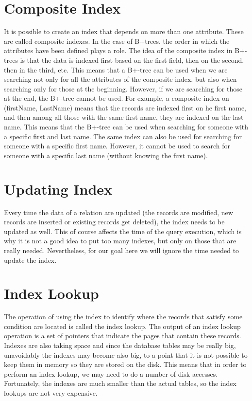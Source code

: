 \documentclass[12pt]{article}
\begin{document}
\section{Composite Index}

It is possible to create an index that depends on more than one attribute. These are called composite indexes. In the case of B+trees, the order in which the attributes have been defined plays a role. The idea of the composite index in B+-trees is that the data is indexed first based on the first field, then on the second, then in the third, etc. This means that a B+-tree can be used when we are searching not only for all the attributes of the composite index, but also when searching only for those at the beginning. However, if we are searching for those at the end, the B+-tree cannot be used. For example, a composite index on (firstName, LastName) means that the records are indexed first on he first name, and then among all those with the same first name, they are indexed on the last name. This means that the B+-tree can be used when searching for someone with a specific first and last name. The same index can also be used for searching for someone with a specific first name. However, it cannot be used to search for someone with a specific last name (without knowing the first name).

\section{Updating Index}

Every time the data of a relation are updated (the records are modified, new records are inserted or existing records get deleted), the index needs to be updated as well. This of course affects the time of the query execution, which is why it is not a good idea to put too many indexes, but only on those that are really needed. Nevertheless, for our goal here we will ignore the time needed to update the index.

\section{Index Lookup}

The operation of using the index to identify where the records that satisfy some condition are located is called the index lookup. The output of an index lookup operation is a set of pointers that indicate the pages that contain these records.
Indexes are also taking space and since the database tables may be really big, unavoidably the indexes may become also big, to a point that it is not possible to keep them in memory so they are stored on the disk. This means that in order to perform an index lookup, we may need to do a number of disk accesses. Fortunately, the indexes are much smaller than the actual tables, so the index lookups are not very expensive.
\end{document}
